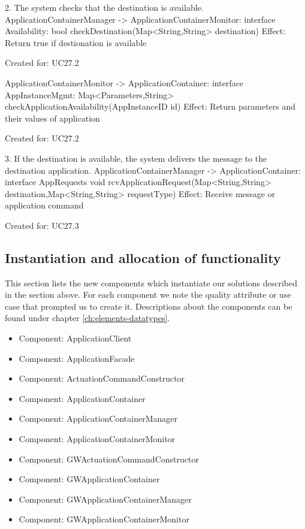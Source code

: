         2. The system checks that the destination is available.
            ApplicationContainerManager -> ApplicationContainerMonitor: interface Availability: 
                                                bool checkDestination(Map<String,String>  destination)
                   Effect: Return true if destionation is available
                   \item Created for: UC27.2
                   
            ApplicationContainerMonitor -> ApplicationContainer: interface AppInstanceMgmt: 
            Map<Parameters,String> checkApplicationAvailability(AppInstanceID id)
                    Effect: Return parameters and their values of application
                   \item Created for: UC27.2
            
        3. If the destination is available, the system delivers the message to the destination application.
            ApplicationContainerManager -> ApplicationContainer: interface AppRequests
                               void rcvApplicationRequest(Map<String,String> destination,Map<String,String> requestType)
                   Effect: Receive message or application command
                   \item Created for: UC27.3

\subsection{Instantiation and allocation of functionality}
    This section lists the new components which instantiate our solutions
    described in the section above. For each component we note the quality
    attribute or use case that prompted us to create it. Descriptions about
    the components can be found under chapter \ref{ch:elements-datatypes}. \\

    \begin{itemize}
        \item Component: ApplicationClient
        \item Component: ApplicationFacade
        \item Component: ActuationCommandConstructor
        \item Component: ApplicationContainer
        \item Component: ApplicationContainerManager
        \item Component: ApplicationContainerMonitor
        \item Component: GWActuationCommandConstructor
        \item Component: GWApplicationContainer
        \item Component: GWApplicationContainerManager
        \item Component: GWApplicationContainerMonitor
    \end{itemize}



